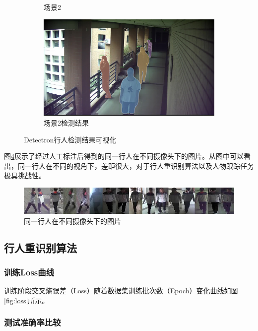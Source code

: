 \begin{figure}
\begin{subfigure}{0.5\textwidth}
\caption{场景2}
\label{fig:detectron21}
\end{subfigure}
\begin{subfigure}{0.5\textwidth}
\centering
\includegraphics[width=0.8\linewidth]{figure/3-7_10_394_det.jpg}
\caption{场景2检测结果}
\label{fig:detectron22}
\end{subfigure}
\caption{Detectron行人检测结果可视化}
\label{fig:detectron}
\end{figure}

图\ref{fig:label}展示了经过人工标注后得到的同一行人在不同摄像头下的图片。从图中可以看出，同一行人在不同的视角下，差距很大，对于行人重识别算法以及人物跟踪任务极具挑战性。

\begin{figure}
\centering
\includegraphics[width=\textwidth]{figure/label}
\caption{同一行人在不同摄像头下的图片}
\label{fig:label}
\end{figure}

\subsection{行人重识别算法}

\subsubsection{训练Loss曲线}

训练阶段交叉熵误差（Loss）随着数据集训练批次数（Epoch）变化曲线如图\ref{fig:loss}所示。

\subsubsection{测试准确率比较}

